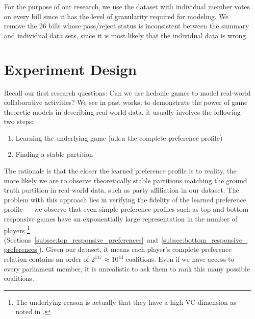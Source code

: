For the purpose of our research, we use the dataset with individual member
votes on every bill since it has the level of granularity required for modeling.
We remove the 26 bills whose pass/reject status is inconsistent between
the summary and individual data sets, since it is most likely that the individual data is wrong.


\section{Experiment Design}
\label{sec:experiment_design}

Recall our first research questions: Can we use hedonic games to model
real-world collaborative activities?
We see in past works, to demonstrate the power of game theoretic models
in describing real-world data, it usually involves the following two steps:

\begin{enumerate}
  \item Learning the underlying game (a.k.a the complete preference profile)
  \item Finding a stable partition
\end{enumerate}

The rationale is that the closer the learned preference profile is to reality,
the more likely we are to observe theoretically stable partitions matching
the ground truth partition in real-world data, such as party affiliation in
our dataset.
The problem with this approach lies in verifying the fidelity of the learned
preference profile --- we observe that even simple preference profiles such as top
and bottom responsive games have an exponentially large representation in the number of players \footnote{The underlying reason is actually that they have a high VC dimension as noted in \cite{ijcai2017-380}.}
(Sections~\ref{subsec:top_responsive_preferences}~and~\ref{subsec:bottom_responsive_preferences}).
Given our dataset, it means each player's complete preference relation contains
an order of $2^{147} \approx 10^{44}$ coalitions.
Even if we have access to every parliament member, it is unrealistic to ask them
to rank this many possible coalitions.

